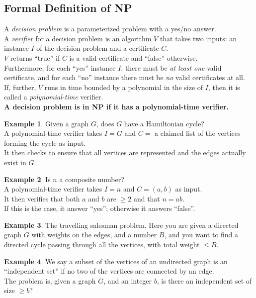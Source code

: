 \documentclass[12pt]{article}
\theoremstyle{plain}
\theoremstyle{definition}
\newtheorem*{ex*}{Example}
\begin{document}
\subsection{Formal Definition of NP}
A \emph{decision problem} is a parameterized problem with a yes/no answer. \\

A \emph{verifier} for a decision problem is an algorithm $V$ that takes two inputs: an instance $I$ of the decision problem and a certificate $C$. \\
$V$ returns ``true'' if $C$ is a valid certificate and ``false'' otherwise. \\
Furthermore, for each ``yes'' instance $I$, there must be \emph{at least one} valid certificate, and for each ``no'' instance there must be \emph{no} valid certificates at all. \\
If, further, $V$ runs in time bounded by a polynomial in the size of $I$, then it is called a \emph{polynomial-time} verifier. \\

\textbf{A decision problem is in NP if it has a polynomial-time verifier.}

\begin{ex*}
Given a graph $G$, does $G$ have a Hamiltonian cycle? \\
A polynomial-time verifier takes $I = G$ and $C =$ a claimed list of the vertices forming the cycle as input. \\
It then checks to ensure that all vertices are represented and the edges actually exist in $G$.
\end{ex*}

\begin{ex*}
Is $n$ a composite number? \\
A polynomial-time verifier takes $I = n$ and $C = (a,b)$ as input. \\
It then verifies that both $a$ and $b$ are $\geq 2$ and that $n = ab$. \\
If this is the case, it answer ``yes'';
otherwise it answers ``false''.
\end{ex*}

\begin{ex*}
The travelling salesman problem.
Here you are given a directed graph $G$ with weights on the edges, and a number $B$, and you want to find a directed cycle passing through all the vertices, with total weight $\leq B$.
\end{ex*}

\begin{ex*}
We say a subset of the vertices of an undirected graph is an ``independent set'' if no two of the vertices are connected by an edge. \\
The problem is, given a graph $G$, and an integer $b$, is there an independent set of size $\geq b$?
\end{ex*}
\end{document}
